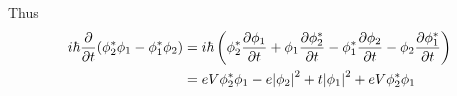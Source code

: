 \documentclass[12pt,a4paper,titlepage]{article}
\begin{document}
Thus
\begin{equation}
\begin{aligned}
i\hbar\pdv{t}(\phi_{2}^{*}\phi_{1}-\phi_{1}^{*}\phi_{2})&=i\hbar\left(\phi_{2}^{*}\pdv{\phi_{1}}{t}+\phi_{1}\pdv{\phi_{2}^{*}}{t}-\phi_{1}^{*}\pdv{\phi_{2}}{t}-\phi_{2}\pdv{\phi_{1}^{*}}{t}\right)\\
&=eV\phi_{2}^{*}\phi_{1}-e\abs{\phi_{2}}^{2}+t\abs{\phi_{1}}^{2}+eV\phi_{2}^{*}\phi_{1}
\end{aligned}
\end{equation}
\end{document}
